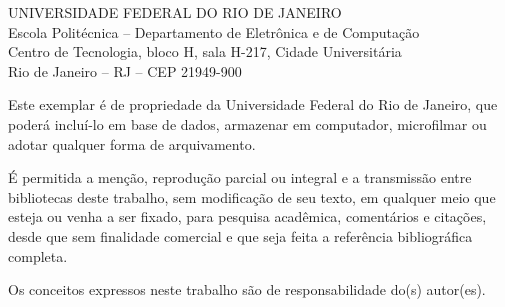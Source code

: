 \pagebreak
\pagestyle{plain}

\noindent
UNIVERSIDADE FEDERAL DO RIO DE JANEIRO\\
Escola Politécnica -- Departamento de Eletrônica e de Computação\\
Centro de Tecnologia, bloco H, sala H-217, Cidade Universitária\\
Rio de Janeiro -- RJ -- CEP 21949-900

\vspace{0.5cm}
Este exemplar é de propriedade da Universidade Federal do Rio de Janeiro, que poderá incluí-lo em base de dados, armazenar em computador, microfilmar ou adotar qualquer forma de arquivamento.

É permitida a menção, reprodução parcial ou integral e a transmissão entre bibliotecas deste trabalho, sem modificação de seu texto, em qualquer meio que esteja ou venha a ser fixado, para pesquisa acadêmica, comentários e citações, desde que sem finalidade comercial e que seja feita a referência bibliográfica completa.

Os conceitos expressos neste trabalho são de responsabilidade do(s) autor(es).
